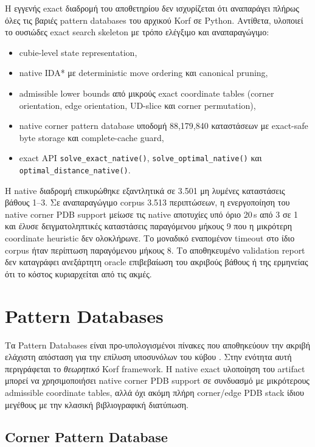Η εγγενής exact διαδρομή του αποθετηρίου δεν ισχυρίζεται ότι αναπαράγει πλήρως
όλες τις βαριές pattern databases του αρχικού Korf σε Python. Αντίθετα,
υλοποιεί το ουσιώδες exact search skeleton με τρόπο ελέγξιμο και αναπαραγώγιμο:
\begin{itemize}
    \item cubie-level state representation,
    \item native IDA* με deterministic move ordering και canonical pruning,
    \item admissible lower bounds από μικρούς exact coordinate tables (corner orientation, edge orientation, UD-slice και corner permutation),
    \item native corner pattern database υποδομή 88,179,840 καταστάσεων με exact-safe byte storage και complete-cache guard,
    \item exact API \texttt{solve\_exact\_native()}, \texttt{solve\_optimal\_native()} και \texttt{optimal\_distance\_native()}.
\end{itemize}

Η native διαδρομή επικυρώθηκε εξαντλητικά σε 3.501 μη λυμένες καταστάσεις
βάθους 1--3. Σε αναπαραγώγιμο corpus 3.513 περιπτώσεων, η ενεργοποίηση του native
corner PDB support μείωσε τις native αποτυχίες υπό όριο 20\,s από 3 σε 1 και έλυσε
δειγματοληπτικές καταστάσεις παραγόμενου μήκους 9 που η μικρότερη coordinate
heuristic δεν ολοκλήρωνε. Το μοναδικό εναπομένον timeout στο ίδιο corpus ήταν
περίπτωση παραγόμενου μήκους 8. Το αποθηκευμένο validation report δεν
καταγράφει ανεξάρτητη oracle επιβεβαίωση του ακριβούς βάθους ή της ερμηνείας
ότι το κόστος κυριαρχείται από τις ακμές.

\section{Pattern Databases}

Τα Pattern Databases είναι προ-υπολογισμένοι πίνακες που αποθηκεύουν την ακριβή
ελάχιστη απόσταση για την επίλυση υποσυνόλων του κύβου
\cite{culberson1998pattern,korf1997finding}. Στην ενότητα αυτή περιγράφεται το
\emph{θεωρητικό} Korf framework. Η native exact υλοποίηση του artifact
μπορεί να χρησιμοποιήσει native corner PDB support σε συνδυασμό με μικρότερους
admissible coordinate tables, αλλά όχι ακόμη πλήρη corner/edge PDB stack ίδιου
μεγέθους με την κλασική βιβλιογραφική διατύπωση.

\subsection{Corner Pattern Database}

